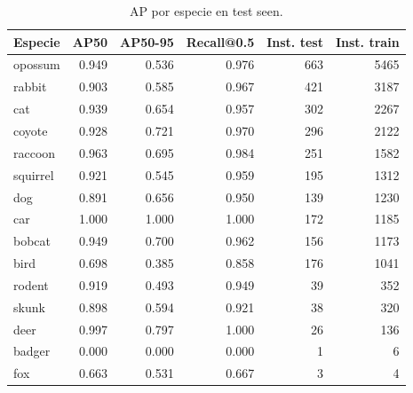 \begin{table}[ht]
\centering
\small
\begin{tabular}{lrrrrr}
\toprule
Especie & AP50 & AP50-95 & Recall@0.5 & Inst. test & Inst. train \\
\midrule
opossum & 0.949 & 0.536 & 0.976 & 663 & 5465 \\
rabbit & 0.903 & 0.585 & 0.967 & 421 & 3187 \\
cat & 0.939 & 0.654 & 0.957 & 302 & 2267 \\
coyote & 0.928 & 0.721 & 0.970 & 296 & 2122 \\
raccoon & 0.963 & 0.695 & 0.984 & 251 & 1582 \\
squirrel & 0.921 & 0.545 & 0.959 & 195 & 1312 \\
dog & 0.891 & 0.656 & 0.950 & 139 & 1230 \\
car & 1.000 & 1.000 & 1.000 & 172 & 1185 \\
bobcat & 0.949 & 0.700 & 0.962 & 156 & 1173 \\
bird & 0.698 & 0.385 & 0.858 & 176 & 1041 \\
rodent & 0.919 & 0.493 & 0.949 & 39 & 352 \\
skunk & 0.898 & 0.594 & 0.921 & 38 & 320 \\
deer & 0.997 & 0.797 & 1.000 & 26 & 136 \\
badger & 0.000 & 0.000 & 0.000 & 1 & 6 \\
fox & 0.663 & 0.531 & 0.667 & 3 & 4 \\
\bottomrule
\end{tabular}
\caption{AP por especie en test seen.}
\label{tab:perclass_test_seen}
\end{table}
